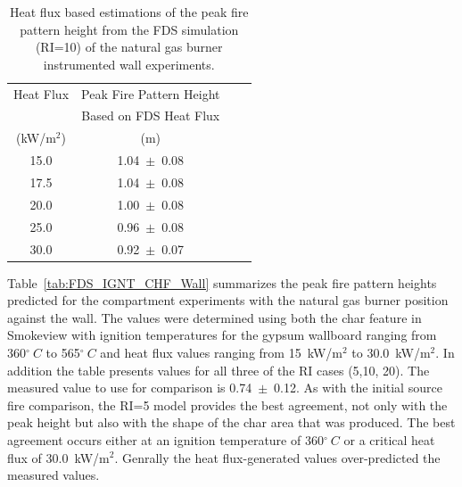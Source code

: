 \documentclass[twoside]{uocthesis}
\begin{document}
{\begin{table}[h]
  \small
  \centering
  \begin{tabular}{|c|c|c|c|} \hline 
Heat Flux 		&  Peak Fire Pattern Height  	      		  \\
    			&  Based on FDS Heat Flux    	  	  	  \\
    (kW/m$^2$)			&  (m) 					 				   \\ 
\hline    15.0			&  1.04~$\pm$~0.08       		            \\
\hline    17.5			&  1.04~$\pm$~0.08							    \\
\hline    20.0			&  1.00~$\pm$~0.08								\\
\hline	  25.0			&  0.96~$\pm$~0.08							   	  \\
\hline    30.0   		&  0.92~$\pm$~0.07							\\  \hline
  \end{tabular}
  \caption[Heat flux based estimations of the peak fire pattern height from the FDS simulation (RI=10) of the natural gas burner instrumented wall experiments.]{Heat flux based estimations of the peak fire pattern height from the FDS simulation (RI=10) of the natural gas burner instrumented wall experiments.}
  \label{tab:FDS_CriticalHF_IWNG}
\end{table}

Table~\ref{tab:FDS_IGNT_CHF_Wall} summarizes the peak fire pattern heights predicted for the compartment experiments with the natural gas burner position against the wall.  The values were determined using both the char feature in Smokeview with ignition temperatures for the gypsum wallboard ranging from 360$^\circ~C$ to 565$^\circ~C$ and heat flux values ranging from 15~kW/m$^2$ to 30.0~kW/m$^2$.  In addition the table presents values for all three of the RI cases (5,10, 20). The measured value to use for comparison is 0.74~$\pm$~0.12.  As with the initial source fire comparison, the RI=5 model provides the best agreement, not only with the peak height but also with the shape of the char area that was produced. The best agreement occurs either at an ignition temperature of 360$^\circ~C$ or a critical heat flux of 30.0~kW/m$^2$. Genrally the heat flux-generated values over-predicted the measured values. 

}
\end{document}
